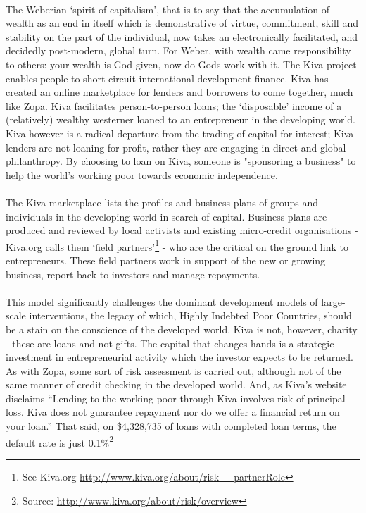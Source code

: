 \documentclass[12pt,a4paper,titlepage]{article}
\begin{document}
\paragraph{}The Weberian `spirit of capitalism', that is to say that the accumulation of wealth as an end in itself which is demonstrative of virtue, commitment, skill and stability on the part of the individual, now takes an electronically facilitated, and decidedly post-modern, global turn. For Weber, with wealth came responsibility to others: your wealth is God given, now do Gods work with it. The Kiva project enables people to short-circuit international development finance. Kiva has created an online marketplace for lenders and borrowers to come together, much like Zopa. Kiva facilitates person-to-person loans; the `disposable' income of a (relatively) wealthy westerner loaned to an entrepreneur in the developing world. Kiva however is a radical departure from the trading of capital for interest; Kiva lenders are not loaning for profit, rather they are engaging in direct and global philanthropy. By choosing to loan on Kiva, someone is "sponsoring a business" to help the world's working poor towards economic independence. 

\paragraph{}The Kiva marketplace lists the profiles and business plans of groups and individuals in the developing world in search of capital. Business plans are produced and reviewed by local activists and existing micro-credit organisations - Kiva.org calls them `field partners'\footnote{See Kiva.org \url{http://www.kiva.org/about/risk__partnerRole}} - who are the critical on the ground link to entrepreneurs. These field partners work in support of the new or growing business, report back to investors and manage repayments.

\paragraph{}This model significantly challenges the dominant development models of large-scale interventions, the legacy of which, Highly Indebted Poor Countries, should be a stain on the conscience of the developed world. Kiva is not, however, charity - these are loans and not gifts. The capital that changes hands is a strategic investment in entrepreneurial activity which the investor expects to be returned. As with Zopa, some sort of risk assessment is carried out, although not of the same manner of credit checking in the developed world. And, as Kiva's website disclaims ``Lending to the working poor through Kiva involves risk of principal loss. Kiva does not guarantee repayment nor do we offer a financial return on your loan.'' That said, on \$4,328,735 of loans with completed loan terms, the default rate is just 0.1\%\footnote{Source: \url{http://www.kiva.org/about/risk/overview}}
\end{document}
